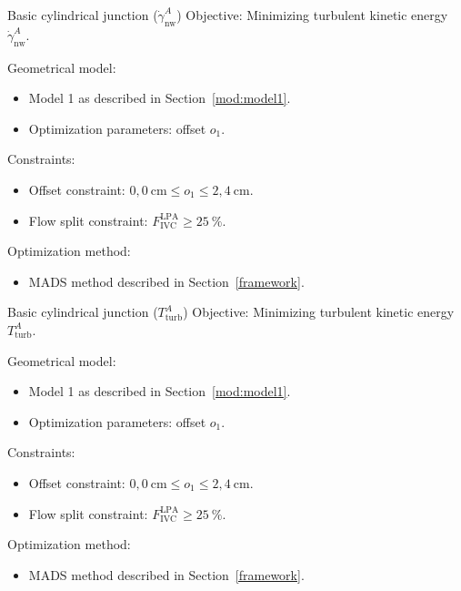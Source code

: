 \begin{optimproblem}{Basic cylindrical junction ($\dot{\gamma}^{A}_{\text{nw}}$)}
	\vspace{2mm}
	Objective: Minimizing turbulent kinetic energy $\dot{\gamma}^{A}_{\text{nw}}$.

	\vspace{2mm}
	Geometrical model:
	\begin{itemize}
		\item Model 1 as described in Section~\ref{mod:model1}.
		\item Optimization parameters: offset $o_1$.
	\end{itemize}
	Constraints:
	\begin{itemize}
		\item Offset constraint: $0{,}0~\text{cm} \leq o_1 \leq 2{,}4~\text{cm}$.
		\item Flow split constraint: $F^{\text{LPA}}_{\text{IVC}} \geq 25~\%$.
	\end{itemize}
	Optimization method:
	\begin{itemize}
		\item MADS method described in Section~\ref{framework}.
	\end{itemize}
	\label{optimprob:3}
\end{optimproblem}
\newpage

\begin{optimproblem}{Basic cylindrical junction ($T^{A}_{\mathrm{turb}}$)}
	\vspace{2mm}
	Objective: Minimizing turbulent kinetic energy $T^{A}_{\mathrm{turb}}$.
		
	\vspace{2mm}
	Geometrical model:
	\begin{itemize}
		\item Model 1 as described in Section~\ref{mod:model1}.
		\item Optimization parameters: offset $o_1$.
	\end{itemize}
	Constraints:
	\begin{itemize}
		\item Offset constraint: $0{,}0~\text{cm} \leq o_1 \leq 2{,}4~\text{cm}$.
		\item Flow split constraint: $F^{\text{LPA}}_{\text{IVC}} \geq 25~\%$.
	\end{itemize}
	Optimization method:
	\begin{itemize}
		\item MADS method described in Section~\ref{framework}.
	\end{itemize}
	\label{optimprob:4}
\end{optimproblem}

